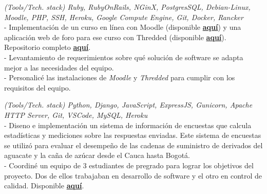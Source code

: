 \documentclass[]{CV-JuanCamiloFlorez}
\begin{document}
\begin{minipage}[t]{0.66\textwidth}
    \focusareas{}
    \textit{(Tools/Tech. stack) Ruby, RubyOnRails, NGinX, PostgresSQL, Debian-Linux, Moodle, PHP, SSH, Heroku, Google Compute Engine, Git, Docker, Rancker} \\
        - Implementación de un curso en línea con Moodle (disponible \textbf{\href{https://gitlab.com/VanJFlorez/animal-modeling-ethics/tree/master/docs/4 LMS build}{aquí}}) y una aplicación web de foro para ese curso con Thredded (disponible \textbf{\href{https://gitlab.com/VanJFlorez/animal-modeling-ethics/blob/master/docs/3\%20Social\%20WebApp/CP\%20etica\%20animal\%20webApp.pdf}{aquí}}). Repositorio completo \textbf{\href{https://gitlab.com/VanJFlorez/animal-modeling-ethics/}{aquí}}. \\
        - Levantamiento de requerimientos sobre qué solución de software se adapta mejor a las necesidades del equipo. \\
        - Personalicé las instalaciones de \textit{Moodle} y \textit{Thredded} para cumplir con los requisitos del equipo. \\
        \sectionsep

    \focusareas{}
    \textit{(Tools/Tech. stack) Python, Django, JavaScript, ExpressJS, Gunicorn, Apache HTTP Server, Git, VSCode, MySQL, Heroku} \\
        - Diseno e implementación un sistema de información de encuestas que calcula estadísticas y mediciones sobre las respuestas enviadas. Este sistema de encuestas se utilizó para evaluar el desempeño de las cadenas de suministro de derivados del aguacate y la caña de azúcar desde el Cauca hasta Bogotá. \\
        - Coordiné un equipo de 3 estudiantes de pregrado para lograr los objetivos del proyecto. Dos de ellos trabajaban en desarrollo de software y el otro en control de calidad. Disponible \textbf{\href{https://gitlab.com/VanJFlorez/sepro-webapp}{aquí}}. \\
        \sectionsep

 
\vspace{\topsep} %



\end{minipage}
\end{document}
